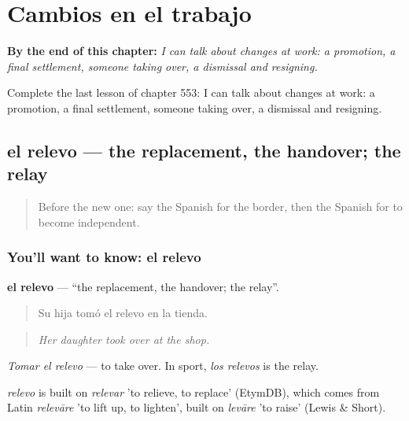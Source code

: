 
\chapter{Cambios en el trabajo}
\label{ch:es-cambios-en-el-trabajo}

\begin{chapteropening}
\textbf{By the end of this chapter:} \emph{I can talk about changes at work: a promotion, a final settlement, someone taking over, a dismissal and resigning.}

Complete the last lesson of chapter 553: I can talk about changes at work: a promotion, a final settlement, someone taking over, a dismissal and resigning.
\end{chapteropening}

\section[el relevo]{el relevo — the replacement, the handover; the relay}

\label{lesson:ES-C553-relevo}



\begin{quote}
Before the new one: say the Spanish for the border, then the Spanish for to become independent.
\end{quote}

\subsection*{You'll want to know: el relevo}
\textbf{el relevo} — \textquotedblleft{}the replacement, the handover; the relay\textquotedblright{}.

\begin{quote}
Su hija tomó el relevo en la tienda.
\end{quote}

\begin{quote}
\emph{Her daughter took over at the shop.}
\end{quote}

\emph{Tomar el relevo} — to take over. In sport, \emph{los relevos} is the relay.

\begin{cousinweb}
\emph{relevo} is built on \emph{relevar} 'to relieve, to replace' (EtymDB), which comes from Latin \emph{relevāre} 'to lift up, to lighten', built on \emph{levāre} 'to raise' (Lewis \& Short).
\end{cousinweb}

